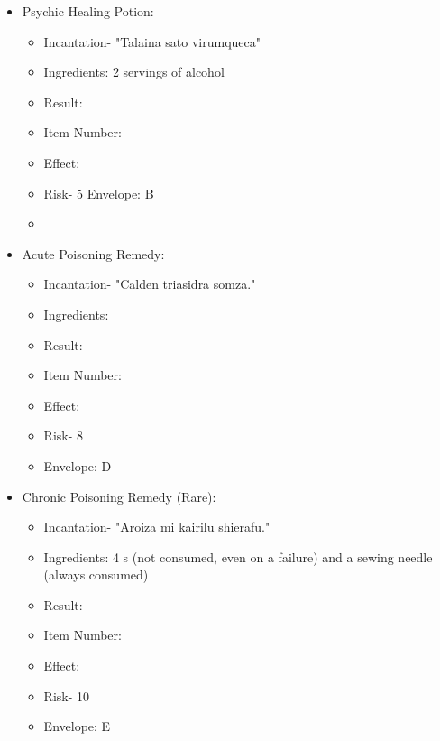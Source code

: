 \documentclass[green]{Kos}
\begin{document}
\begin{itemize}

\item Psychic Healing Potion:
\begin{itemize}
\item Incantation- "Talaina sato virumqueca"
\item Ingredients: 2 servings of alcohol
\item Result: \iPsychicHealthRemedy{\MYname}
\item Item Number: \iPsychicHealthRemedy{\MYnumber}
\item Effect: \iPsychicHealthRemedy{\MYtext}
\item Risk- 5
Envelope: B
\item
\end{itemize}
\item Acute Poisoning Remedy:
\begin{itemize}
\item Incantation- "Calden triasidra somza."
\item Ingredients: \iHerbs{}
\item Result: \iAcutePoisonRemedy{\MYname}
\item Item Number: \iAcutePoisonRemedy{\MYnumber}
\item Effect: \iAcutePoisonRemedy{\MYtext}
\item Risk- 8
\item Envelope: D
\end{itemize}
\item Chronic Poisoning Remedy (Rare):
\begin{itemize}
\item Incantation- "Aroiza mi kairilu shierafu."
\item Ingredients: 4 \iEmerald{\MYname}s (not consumed, even on a failure) and a sewing needle (always consumed)
\item Result: \iChronicPoisonRemedy{\MYname}
\item Item Number: \iChronicPoisonRemedy{\MYnumber}
\item Effect: \iChronicPoisonRemedy{\MYtext}
\item Risk- 10
\item Envelope: E
\end{itemize}
\end{itemize}
\end{document}
